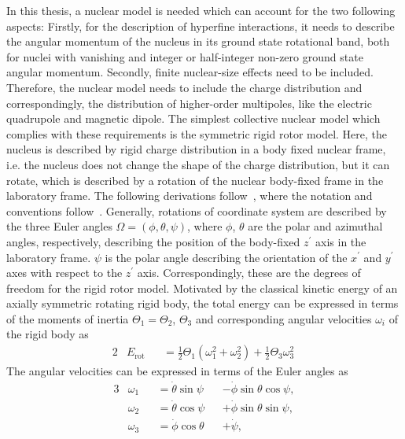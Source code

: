 \label{app:rig_rotor}%
In this thesis, a nuclear model is needed which can account for the two following aspects: Firstly, for the description of hyperfine interactions, it needs to describe the angular momentum of the nucleus in its ground state rotational band, both for nuclei with vanishing and integer or half-integer non-zero ground state angular momentum. Secondly, finite nuclear-size effects need to be included. Therefore, the nuclear model needs to include the charge distribution and correspondingly, the distribution of higher-order multipoles, like the electric quadrupole and magnetic dipole. The simplest collective nuclear model which complies with these requirements is the symmetric rigid rotor model. Here, the nucleus is described by rigid charge distribution in a body fixed nuclear frame, i.e. the nucleus does not change the shape of the charge distribution, but it can rotate, which is described by a rotation of the nuclear body-fixed frame in the laboratory frame. The following derivations follow~\cite{edmonds1960,brown_carrington,varshalovich1988}, where the notation and conventions follow~\cite{varshalovich1988}. Generally, rotations of coordinate system are described by the three Euler angles $\Omega=(\phi,\theta,\psi)$, where $\phi$, $\theta$ are the polar and azimuthal angles, respectively, describing the position of the body-fixed $z^{\prime}$ axis in the laboratory frame. $\psi$ is the polar angle describing the orientation of the $x^{\prime}$ and $y^{\prime}$ axes with respect to the $z^{\prime}$ axis. Correspondingly, these are the degrees of freedom for the rigid rotor model. Motivated by the classical kinetic energy of an axially symmetric rotating rigid body, the total energy can be expressed in terms of the moments of inertia ${\Theta_1}{=}{\Theta_2}$, $\Theta_3$ and corresponding angular velocities $\omega_i$ of the rigid body as
\begin{alignat}{2}
&E_{\text{rot}} &&= \frac{1}{2}\Theta_1 \left(\omega_1^2 +\omega_2^2\right)  + \frac{1}{2}\Theta_3 \omega_3 ^2\
\end{alignat}
The angular velocities can be expressed in terms of the Euler angles as
\begin{alignat}{3}
& \omega_1 &&=\dot{\theta}\sin\psi &&-\dot{\phi}\sin\theta\cos\psi,\\
& \omega_2 &&=\dot{\theta}\cos\psi &&+\dot{\phi}\sin\theta\sin\psi,\\
& \omega_3 &&=\dot{\phi}\cos\theta &&+ \dot{\psi},
\end{alignat}
